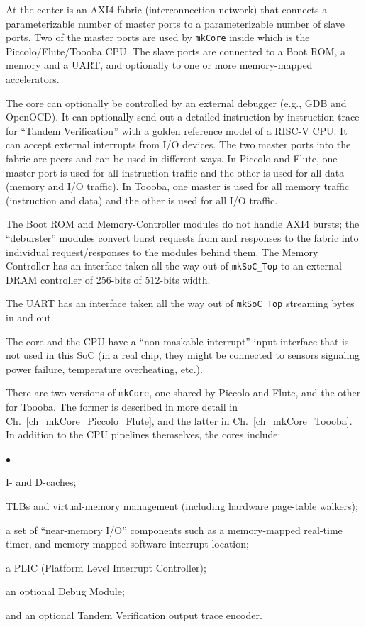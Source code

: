 \documentclass[11pt]{book}
\newenvironment{tightlist}%
{\begin{list}{$\bullet$}{%
    \setlength{\topsep}{0in}
    \setlength{\partopsep}{0in}
    \setlength{\itemsep}{0in}
    \setlength{\parsep}{0in}
    \setlength{\leftmargin}{1.5em}
    \setlength{\rightmargin}{0in}
    \setlength{\itemindent}{0in}
}
}%
{\end{list}
}
\newcommand{\cf}{\footnotesize\tt}
\begin{document}
At the center is an AXI4 fabric (interconnection network) that
connects a parameterizable number of master ports to a
parameterizable number of slave ports.  Two of the master ports are
used by {\cf mkCore} inside which is the Piccolo/Flute/Toooba CPU.
The slave ports are connected to a Boot ROM, a memory and a UART, and
optionally to one or more memory-mapped accelerators.

The core can optionally be controlled by an external debugger (e.g.,
GDB and OpenOCD).  It can optionally send out a detailed
instruction-by-instruction trace for ``Tandem Verification'' with a
golden reference model of a RISC-V CPU.  It can accept external
interrupts from I/O devices.  The two master ports into the fabric are
peers and can be used in different ways.  In Piccolo and Flute, one
master port is used for all instruction traffic and the other is used
for all data (memory and I/O traffic).  In Toooba, one master is used
for all memory traffic (instruction and data) and the other is used
for all I/O traffic.

The Boot ROM and Memory-Controller modules do not handle AXI4 bursts;
the ``deburster'' modules convert burst requests from and responses to
the fabric into individual request/responses to the modules behind
them.  The Memory Controller has an interface taken all the way out of
{\cf mkSoC\_Top} to an external DRAM controller of 256-bits of
512-bits width.

The UART has an interface taken all the way out of {\cf mkSoC\_Top}
streaming bytes in and out.

The core and the CPU have a ``non-maskable interrupt'' input interface
that is not used in this SoC (in a real chip, they might be connected
to sensors signaling power failure, temperature overheating, etc.).

There are two versions of {\cf mkCore}, one shared by Piccolo and
Flute, and the other for Toooba.  The former is described in more
detail in Ch.~\ref{ch_mkCore_Piccolo_Flute}, and the latter in
Ch.~\ref{ch_mkCore_Toooba}.  In addition to the CPU pipelines
themselves, the cores include:

\begin{tightlist}

\item I- and D-caches;

\item TLBs and virtual-memory management (including hardware page-table walkers);

\item a set of ``near-memory I/O'' components such as a memory-mapped
real-time timer, and memory-mapped software-interrupt location;

\item a PLIC (Platform Level Interrupt Controller);

\item an optional Debug Module;

\item and an optional Tandem Verification output trace encoder.

\end{tightlist}
\end{document}
